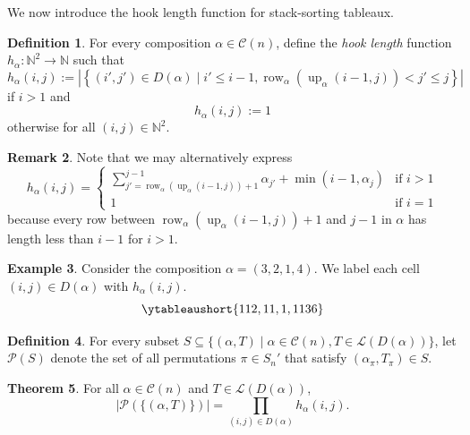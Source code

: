 \documentclass[12pt]{amsart}
\DeclareMathOperator{\row}{row}
\DeclareMathOperator{\upof}{up}
\theoremstyle{definition}
\newtheorem{theorem}{Theorem}[section]
\newtheorem{example}[theorem]{Example}
\newtheorem{definition}[theorem]{Definition}
\newtheorem{remark}[theorem]{Remark}
\begin{document}
We now introduce the hook length function for stack-sorting tableaux. 
\begin{definition}
For every composition $\alpha\in\mathcal{C}(n)$, define the \emph{hook length} function $h_{\alpha}:\mathbb{N}^2\to \mathbb{N}$ such that
\[h_{\alpha}(i,j):=\left|\left\{(i',j')\in D(\alpha)\mid i'\le i-1,\row_{\alpha}(\upof_{\alpha}(i-1,j))<j'\le j\right\}\right|\]
if $i>1$ and
\[h_{\alpha}(i,j):=1\]
otherwise for all $(i,j)\in \mathbb{N}^2$.
\end{definition}
\begin{remark}\label{rem:hook}
Note that we may alternatively express
\[h_{\alpha}(i,j)=\begin{cases}\sum_{j'=\row_{\alpha}(\upof_{\alpha}(i-1,j))+1}^{j-1} \alpha_{j'} + \min(i-1,\alpha_j) & \text{if } i>1 \\ 1 &\text{if }i=1\end{cases}\]
because every row between $\row_{\alpha}(\upof_{\alpha}(i-1,j))+1$ and $j-1$ in $\alpha$ has length less than $i-1$ for $i>1$.
\end{remark}
\begin{example}
Consider the composition $\alpha=(3,2,1,4)$. We label each cell $(i,j)\in D(\alpha)$ with $h_{\alpha}(i,j)$.
\[\ytableaushort{{1}{1}{2},{1}{1},{1},{1}{1}{3}{6}}\]
\end{example}
\begin{definition}
For every subset $S\subseteq \{(\alpha,T)\mid \alpha\in \mathcal{C}(n),T\in \mathcal{L}(D(\alpha))\}$, let $\mathcal{P}(S)$ denote the set of all permutations $\pi\in S_n'$ that satisfy $(\alpha_{\pi},T_{\pi})\in S$.
\end{definition}
\begin{theorem}\label{thm:PT}
For all $\alpha\in\mathcal{C}(n)$ and $T\in\mathcal{L}(D(\alpha))$,
\[|\mathcal{P}(\{(\alpha,T)\})| = \prod_{(i,j)\in D(\alpha)}h_{\alpha}(i,j).\]
\end{theorem}
\end{document}
